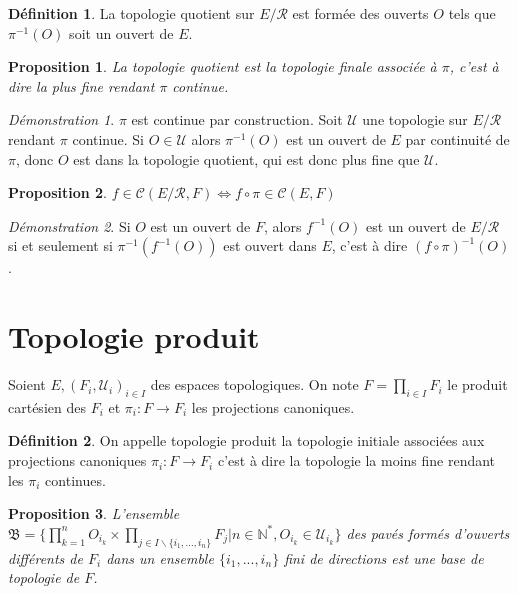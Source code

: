 \documentclass[a4paper, 11pt, french]{book}
\theoremstyle{plain} %
\newtheorem{proposition}{Proposition}
\theoremstyle{definition} %
\newtheorem{definition}{Définition}
\theoremstyle{remark} %
\newtheorem*{demonstration}{Démonstration}
\renewcommand{\setminus}{\backslash}
\newcommand{\1}{\mathds{1}}
\newcommand{\cont}{\mathcal{C}}
\newcommand{\inv}[1]{#1^{-1}}
\newcommand{\N}{\mathbb{N}}
\begin{document}
\begin{definition}
	La topologie quotient sur $E/\mathcal{R}$ est formée des ouverts $O$ tels que $\inv{\pi}(O)$ soit un ouvert de $E$.
\end{definition}

\begin{proposition}
	La topologie quotient est la topologie finale associée à $\pi$, c'est à dire la plus fine rendant $\pi$ continue.
\end{proposition}

\begin{demonstration}
	$\pi$ est continue par construction.
	Soit $\mathscr{U}$ une topologie sur $E/\mathcal{R}$ rendant $\pi$ continue.
	Si $O\in\mathscr{U}$ alors $\inv{\pi}(O)$ est un ouvert de $E$ par continuité de $\pi$, donc $O$ est dans la topologie quotient, qui est donc plus fine que $\mathscr{U}$.
\end{demonstration}

\begin{proposition}
	$f\in\cont(E/\mathcal{R}, F)\iff f\circ\pi\in\cont(E, F)$
\end{proposition}

\begin{demonstration}
	Si $O$ est un ouvert de $F$, alors $\inv{f}(O)$ est un ouvert de $E/\mathcal{R}$ si et seulement si $\inv{\pi}(\inv{f}(O))$ est ouvert dans $E$, c'est à dire $\inv{(f\circ\pi)}(O)$.
\end{demonstration}

\section{Topologie produit}

Soient $E, (F_i, \mathscr{U}_i)_{i\in I}$ des espaces topologiques.
On note $F=\prod_{i\in I} F_i$ le produit cartésien des $F_i$ et $\pi_i\colon F\rightarrow F_i$ les projections canoniques.

\begin{definition}
	On appelle topologie produit la topologie initiale associées aux projections canoniques $\pi_i\colon F\rightarrow F_i$ c'est à dire la topologie la moins fine rendant les $\pi_i$ continues.
\end{definition}

\begin{proposition}
	L'ensemble $\mathfrak{B}=\{\prod_{k=1}^nO_{i_k}\times\prod_{j\in I\setminus\{i_1, ..., i_n\}}F_j|n\in\N^*, O_{i_k}\in\mathscr{U}_{i_k}\}$ des pavés formés d'ouverts différents de $F_i$ dans un ensemble $\{i_1,...,i_n\}$ fini de directions est une base de topologie de $F$.
\end{proposition}
\end{document}
